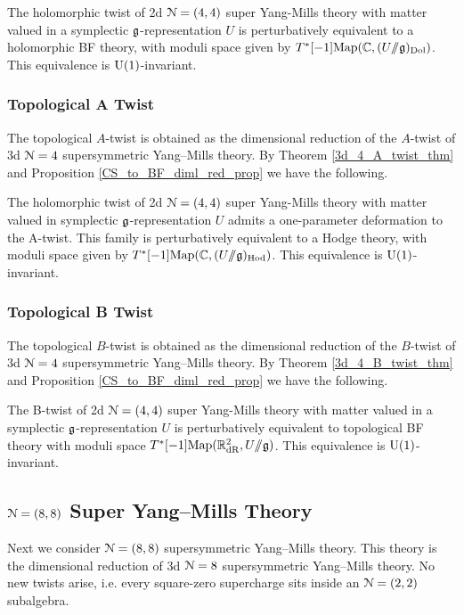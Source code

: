 \documentclass[10pt, oneside]{article}
\newcommand{\ham}{/\!\!/}
\begin{document}
\begin{theorem}
The holomorphic twist of 2d $\mathcal{N}=(4,4)$ super Yang-Mills theory with matter valued in a symplectic $\mathfrak g$-representation $U$ is perturbatively equivalent to a holomorphic BF theory, with moduli space given by $T^*[-1]\mr{Map}(\CC, (U \ham \gg)_{\mr{Dol}})$. 
This equivalence is $\mathrm{U}(1)$-invariant.
\end{theorem}

\subsubsection{Topological A Twist} \label{sect:2d44Atwist}
The topological $A$-twist is obtained as the dimensional reduction of the $A$-twist of 3d $\mathcal{N}=4$ supersymmetric Yang--Mills theory.
By Theorem \ref{3d_4_A_twist_thm} and Proposition \ref{CS_to_BF_diml_red_prop} we have the following. 

\begin{theorem}
The holomorphic twist of 2d $\mathcal{N}=(4,4)$ super Yang-Mills theory with matter valued in symplectic $\mathfrak g$-representation $U$ admits a one-parameter deformation to the A-twist.  
This family is perturbatively equivalent to a Hodge theory, with moduli space given by $T^*[-1]\mr{Map}(\CC, (U \ham \gg)_{\mr{Hod}})$.   This equivalence is $\mathrm{U}(1)$-invariant.
\end{theorem}

\subsubsection{Topological B Twist} \label{sect:2d44Btwist}

The topological $B$-twist is obtained as the dimensional reduction of the $B$-twist of 3d $\mathcal{N}=4$ supersymmetric Yang--Mills theory.
By Theorem \ref{3d_4_B_twist_thm} and Proposition \ref{CS_to_BF_diml_red_prop} we have the following. 

\begin{theorem}
The B-twist of 2d $\mathcal{N}=(4,4)$ super Yang-Mills theory with matter valued in a symplectic $\mathfrak g$-representation $U$ is perturbatively equivalent to topological BF theory with moduli space $T^*[-1]\mr{Map}(\RR^2_{\mr{dR}}, U \ham \gg)$.  This equivalence is $\mathrm{U}(1)$-invariant.
\end{theorem}

\subsection{\texorpdfstring{$\mathcal N=(8,8)$}{N=(8,8)} Super Yang--Mills Theory} \label{sect:2d(8,8)}
Next we consider $\mathcal{N}=(8,8)$ supersymmetric Yang--Mills theory.
This theory is the dimensional reduction of 3d $\mathcal{N}=8$ supersymmetric Yang--Mills theory.
No new twists arise, i.e. every square-zero supercharge sits inside an $\mathcal{N}=(2,2)$ subalgebra.
\end{document}
